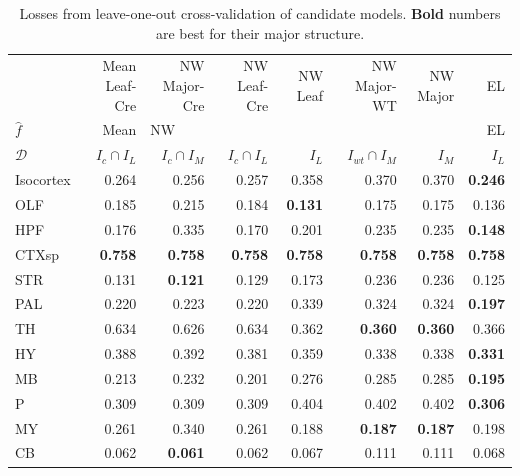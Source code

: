 \begin{table}[H]
\small
\begin{tabular}{lrrrrrrr}
\toprule
& Mean Leaf-Cre & NW Major-Cre& NW Leaf-Cre & NW Leaf &NW Major-WT  & NW Major & EL \\
$\widehat f$ &           Mean & \multicolumn{5}{l}{NW} &     EL \\
$\mathcal D$ & $I_c \cap I_L$ & $I_c \cap I_M$ & $I_c \cap I_L$ & $I_L$ & $I_{wt} \cap I_M$ &  $I_M$ &  $I_L$ \\
\midrule
Isocortex &          0.264 &          0.256 &          0.257 &             0.358 &          0.370 &  0.370 &  \textbf{0.246} \\
OLF       &          0.185 &          0.215 &          0.184 &             \textbf{0.131 }&          0.175 &  0.175 &  0.136 \\
HPF       &          0.176 &          0.335 &          0.170 &             0.201 &          0.235 &  0.235 &  \textbf{0.148} \\
CTXsp     &         \textbf{ 0.758} &          \textbf{0.758} &          \textbf{0.758} &             \textbf{0.758 }&          \textbf{0.758 }&  \textbf{0.758 }&  \textbf{0.758} \\
STR       &          0.131 &         \textbf {0.121} &          0.129 &             0.173 &          0.236 &  0.236 &  0.125 \\
PAL       &          0.220 &          0.223 &          0.220 &             0.339 &          0.324 &  0.324 &  \textbf{0.197} \\
TH        &          0.634 &          0.626 &          0.634 &             0.362 &         \textbf {0.360} &  \textbf{0.360 }&  0.366 \\
HY        &          0.388 &          0.392 &          0.381 &             0.359 &          0.338 &  0.338 &  \textbf{0.331} \\
MB        &          0.213 &          0.232 &          0.201 &             0.276 &          0.285 &  0.285 &  \textbf{0.195} \\
P         &          0.309 &          0.309 &          0.309 &             0.404 &          0.402 &  0.402 &  \textbf{0.306} \\
MY        &          0.261 &          0.340 &          0.261 &             0.188 &         \textbf{ 0.187 }&  \textbf{0.187} &  0.198 \\
CB        &          0.062 &          \textbf{0.061} &          0.062 &             0.067 &          0.111 &  0.111 &  0.068 \\
\bottomrule
\end{tabular}
\caption{Losses from leave-one-out cross-validation of candidate models. \textbf{Bold} numbers are best for their major structure.}
\label{tab:crossvalidation}
\end{table}

